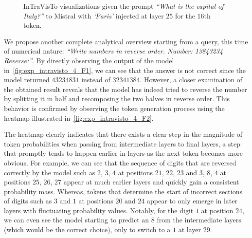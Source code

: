 \begin{figure}[t!]
    \centering
    \begingroup%
    \captionsetup{width=0.63\textwidth}%
    \endgroup%
    \caption[InTraVisTo visualizations given the prompt \emph{``What is the capital of Italy?''} to Mistral with injections.]{InTraVisTo visualizations given the prompt \emph{``What is the capital of Italy?''} to Mistral with \emph{`Paris'} injected at layer $25$ for the $16$th token.}
    \label{fig:exp_intravisto_4_E}
\end{figure}

We propose another complete analytical overview starting from a query, this time of numerical nature: \emph{``Write numbers in reverse order. Number: 13843234 Reverse:''}.
By directly observing the output of the model in~\cref{fig:exp_intravisto_4_F1}, we can see that the answer is not correct since the model returned $43234831$ instead of $32341384$.
However, a closer examination of the obtained result reveals that the model has indeed tried to reverse the number by splitting it in half and recomposing the two halves in reverse order.
This behavior is confirmed by observing the token generation process using the heatmap illustrated in~\cref{fig:exp_intravisto_4_F2}.

The heatmap clearly indicates that there exists a clear step in the magnitude of token probabilities when passing from intermediate layers to final layers, a step that promptly tends to happen earlier in layers as the next token becomes more obvious.
For example, we can see that the sequence of digits that are reversed correctly by the model such as $2$, $3$, $4$ at positions $21$, $22$, $23$ and $3$, $8$, $4$ at positions $25$, $26$, $27$ appear at much earlier layers and quickly gain a consistent probability mass.
Whereas, tokens that determine the start of incorrect sections of digits such as $3$ and $1$ at positions $20$ and $24$ appear to only emerge in later layers with fluctuating probability values.
Notably, for the digit $1$ at position $24$, we can even see the model starting to predict an $8$ from the intermediate layers (which would be the correct choice), only to switch to a $1$ at layer $29$.

